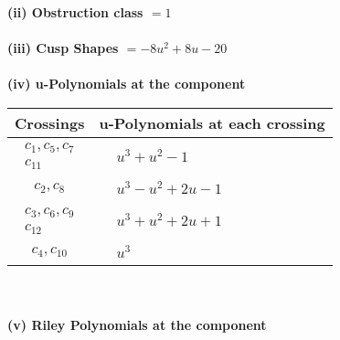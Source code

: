 \documentclass[1p]{elsarticle_modified}
\theoremstyle{definition}
\begin{document}
\flushleft \textbf{(ii) Obstruction class $= 1$}\\~\\
\flushleft \textbf{(iii) Cusp Shapes $= -8 u^2+8 u-20$}\\~\\
\newpage\renewcommand{\arraystretch}{1}
\flushleft \textbf{(iv) u-Polynomials at the component}\newline \\
\begin{tabular}{m{50pt}|m{274pt}}
Crossings & \hspace{64pt}u-Polynomials at each crossing \\
\hline $$\begin{aligned}c_{1},c_{5},c_{7}\\c_{11}\end{aligned}$$&$\begin{aligned}
&u^3+u^2-1
\end{aligned}$\\
\hline $$\begin{aligned}c_{2},c_{8}\end{aligned}$$&$\begin{aligned}
&u^3- u^2+2 u-1
\end{aligned}$\\
\hline $$\begin{aligned}c_{3},c_{6},c_{9}\\c_{12}\end{aligned}$$&$\begin{aligned}
&u^3+u^2+2 u+1
\end{aligned}$\\
\hline $$\begin{aligned}c_{4},c_{10}\end{aligned}$$&$\begin{aligned}
&u^3
\end{aligned}$\\
\hline
\end{tabular}\\~\\
\newpage\renewcommand{\arraystretch}{1}
\flushleft \textbf{(v) Riley Polynomials at the component}\newline \\
\end{document}

